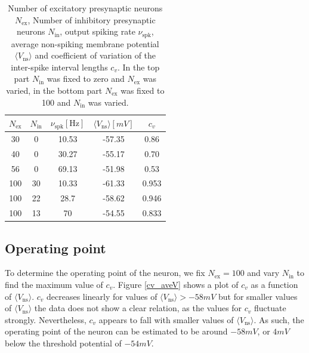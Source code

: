 \documentclass{scrartcl}
\begin{document}
\begin{table}
\centering
\begin{tabular}{c c c c c}
$N_\mathrm{ex}$ & $N_\mathrm{in}$ & $\nu_\mathrm{spk} [\si{\hertz}]$ &$\langle V_\mathrm{ns}\rangle [\si{mV}]$ & $c_v$ \\ \hline \hline
30 & 0 & 10.53 & -57.35 & 0.86\\
40 & 0 & 30.27 & -55.17 & 0.70\\
56 & 0 & 69.13 & -51.98 & 0.53\\ \hline
100 & 30 & 10.33 & -61.33& 0.953\\
100 & 22 & 28.7 & -58.62& 0.946\\
100 & 13 & 70 & -54.55& 0.833\\
\end{tabular}
\caption{Number of excitatory presynaptic neurons $N_\mathrm{ex}$, Number of inhibitory presynaptic neurons $N_\mathrm{in}$, output spiking rate $\nu_\mathrm{spk}$, average non-spiking membrane potential $\langle V_\mathrm{ns}\rangle$ and coefficient of variation of the inter-spike interval lengths $c_v$. In the top part $N_\mathrm{in}$ was fixed to zero and $N_\mathrm{ex}$ was varied, in the bottom part $N_\mathrm{ex}$ was fixed to 100 and $N_\mathrm{in}$ was varied.}
\label{rates}
\end{table}

\subsection*{Operating point}

To determine the operating point of the neuron, we fix $N_\mathrm{ex}=100$ and vary $N_\mathrm{in}$ to find the maximum value of $c_v$. Figure \ref{cv_aveV} shows a plot of $c_v$ as a function of $\langle V_\mathrm{ns}\rangle$. $c_v$ decreases linearly for values of $\langle V_\mathrm{ns}\rangle > -58\si{mV}$ but for smaller values of $\langle V_\mathrm{ns}\rangle$ the data does not show a clear relation, as the values for $c_v$ fluctuate strongly. Nevertheless, $c_v$ appears to fall with smaller values of $\langle V_\mathrm{ns}\rangle$. As such, the operating point of the neuron can be estimated to be around $-58\si{mV}$, or $4\si{mV}$ below the threshold potential of $-54\si{mV}$.
\end{document}
